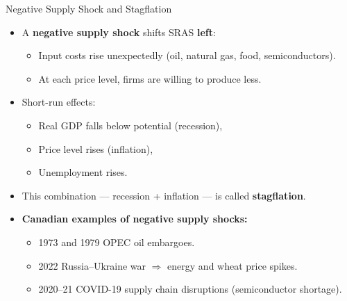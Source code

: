 \documentclass[aspectratio=169]{beamer}
\begin{document}
\begin{frame}{Negative Supply Shock and Stagflation}
\transfade
\begin{itemize}
  \item A \textbf{negative supply shock} shifts SRAS \textbf{left}:
  \begin{itemize}
    \item Input costs rise unexpectedly (oil, natural gas, food, semiconductors).
    \item At each price level, firms are willing to produce less.
  \end{itemize}
  \item Short-run effects:
  \begin{itemize}
    \item Real GDP falls below potential (recession),
    \item Price level rises (inflation),
    \item Unemployment rises.
  \end{itemize}
  \item This combination --- recession + inflation --- is called \textbf{stagflation}.
  \item \textbf{Canadian examples of negative supply shocks:}
  \begin{itemize}
    \item 1973 and 1979 OPEC oil embargoes.
    \item 2022 Russia--Ukraine war $\Rightarrow$ energy and wheat price spikes.
    \item 2020--21 COVID-19 supply chain disruptions (semiconductor shortage).
  \end{itemize}
\end{itemize}
\end{frame}
\end{document}
